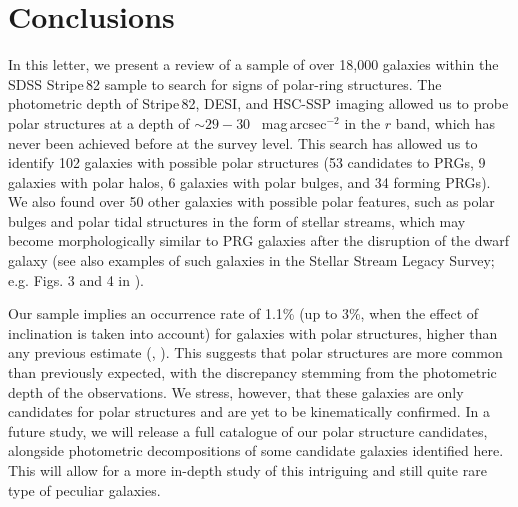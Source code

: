 \documentclass[letter]{aa}
\begin{document}
\section{Conclusions}
\label{sec:conclusions}

In this letter, we present a review of a sample of over 18,000 galaxies within the SDSS Stripe\,82 sample to search for signs of polar-ring structures. The photometric depth of Stripe\,82, DESI, and HSC-SSP imaging allowed us to probe polar structures at a depth of $\sim29-30$~ mag\,arcsec$^{-2}$ in the $r$ band, which has never been achieved before at the survey level. This search has allowed us to identify 102 galaxies with possible polar structures (53 candidates to PRGs, 9 galaxies with polar halos, 6 galaxies with polar bulges, and 34 forming PRGs). We also found over 50 other galaxies with possible polar features, such as polar bulges and polar tidal structures in the form of stellar streams, which may become morphologically similar to PRG galaxies after the disruption of the dwarf galaxy (see also examples of such galaxies in the Stellar Stream Legacy Survey; e.g. Figs. 3 and 4 in \citealt{2023A&A...671A.141M}).

Our sample implies an occurrence rate of 1.1\% (up to 3\%, when the effect of inclination is taken into account) for galaxies with polar structures, higher than any previous estimate (\citealt{1990AJ....100.1489W}, \citealt{2011MNRAS.418..244M}). This suggests that polar structures are more common than previously expected, with the discrepancy stemming from the photometric depth of the observations. We stress, however, that these galaxies are only candidates for polar structures and are yet to be kinematically confirmed. In a future study, we will release a full catalogue of our polar structure candidates, alongside photometric decompositions of some candidate galaxies identified here. 
This will allow for a more in-depth study of this intriguing and still quite rare type of peculiar galaxies.
\end{document}
